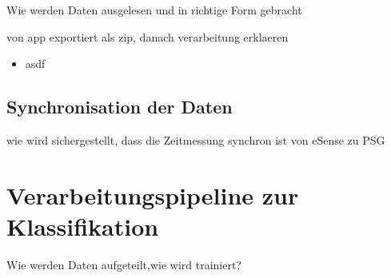 Wie werden Daten ausgelesen und in richtige Form gebracht

von app exportiert als zip, danach verarbeitung erklaeren

\begin{itemize}
    \item asdf
\end{itemize}

\subsection{Synchronisation der Daten}
wie wird sichergestellt, dass die Zeitmessung synchron ist von eSense zu PSG

\section{Verarbeitungspipeline zur Klassifikation}
Wie werden Daten aufgeteilt,wie wird trainiert?
